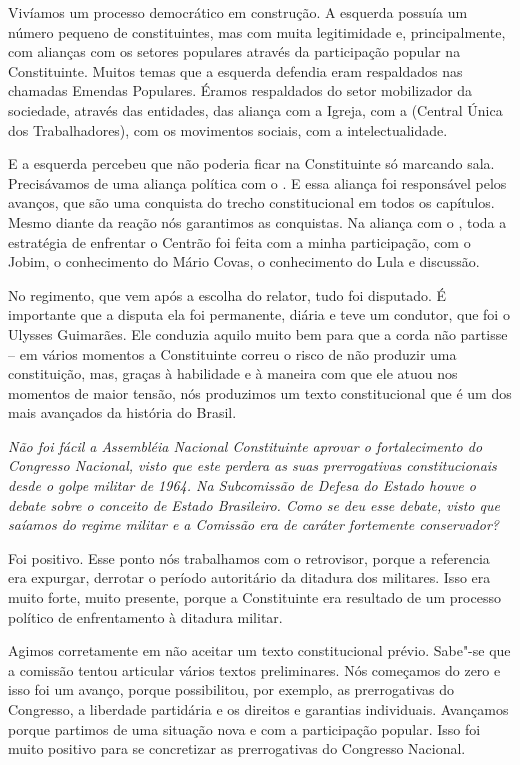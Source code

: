 Vivíamos um processo democrático em construção. A
esquerda possuía um número pequeno de constituintes, mas com muita
legitimidade e, principalmente, com alianças com os setores populares
através da participação popular na Constituinte. Muitos temas que a
esquerda defendia eram respaldados nas chamadas Emendas Populares.
Éramos respaldados do setor mobilizador da sociedade, através das
entidades, das aliança com a Igreja, com a  (Central Única dos
Trabalhadores), com os movimentos sociais, com a intelectualidade.

E a esquerda percebeu que não poderia ficar na Constituinte só marcando
sala. Precisávamos de uma aliança política com o . E essa aliança
foi responsável pelos avanços, que são uma conquista do trecho
constitucional em todos os capítulos. Mesmo diante da reação nós
garantimos as conquistas. Na aliança com o , toda a estratégia de
enfrentar o Centrão foi feita com a minha participação, com o Jobim, o
conhecimento do Mário Covas, o conhecimento do Lula e discussão.

No regimento, que vem após a escolha do relator, tudo foi disputado. É
importante que a disputa ela foi permanente, diária e teve um condutor,
que foi o Ulysses Guimarães. Ele conduzia aquilo muito bem para que a
corda não partisse -- em vários momentos a Constituinte correu o risco
de não produzir uma constituição, mas, graças à habilidade e à maneira
com que ele atuou nos momentos de maior tensão, nós produzimos um texto
constitucional que é um dos mais avançados da história do Brasil.

\medskip

\noindent\emph{Não foi fácil a Assembléia Nacional Constituinte aprovar o
fortalecimento do Congresso Nacional, visto que este perdera as suas
prerrogativas constitucionais desde o golpe militar de 1964. Na
Subcomissão de Defesa do Estado houve o debate sobre o conceito de
Estado Brasileiro. Como se deu esse debate, visto que saíamos do regime
militar e a Comissão era de caráter fortemente conservador?}

Foi positivo. Esse ponto nós trabalhamos com o
retrovisor, porque a referencia era expurgar, derrotar o período
autoritário da ditadura dos militares. Isso era muito forte, muito
presente, porque a Constituinte era resultado de um processo político de
enfrentamento à ditadura militar.

Agimos corretamente em não aceitar um texto constitucional prévio.
Sabe"-se que a comissão tentou articular vários textos preliminares. Nós
começamos do zero e isso foi um avanço, porque possibilitou, por
exemplo, as prerrogativas do Congresso, a liberdade partidária e os
direitos e garantias individuais. Avançamos porque partimos de uma
situação nova e com a participação popular. Isso foi muito positivo para
se concretizar as prerrogativas do Congresso Nacional.

